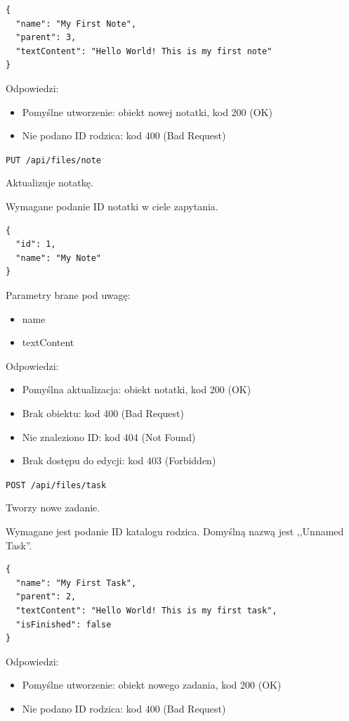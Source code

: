 \documentclass[a4paper,twoside,12pt]{book}
\begin{document}
\begin{verbatim}
{
  "name": "My First Note",
  "parent": 3,
  "textContent": "Hello World! This is my first note"
}
\end{verbatim}

Odpowiedzi: 
\begin{itemize}
	\item Pomyślne utworzenie: obiekt nowej notatki, kod 200 (OK) 
	\item Nie podano ID rodzica: kod 400 (Bad Request)
\end{itemize}

\label{update-note}

\texttt{PUT\ /api/files/note}

Aktualizuje notatkę.

Wymagane podanie ID notatki w ciele zapytania.

\begin{verbatim}
{
  "id": 1,
  "name": "My Note"
}
\end{verbatim}

Parametry brane pod uwagę: 
\begin{itemize}
	\item  name \item  textContent
\end{itemize}

Odpowiedzi: 
\begin{itemize}
	\item Pomyślna aktualizacja: obiekt notatki, kod 200 (OK) 
	\item Brak obiektu: kod 400 (Bad Request) 
	\item Nie znaleziono ID: kod 404 (Not Found)
	\item Brak dostępu do edycji: kod 403 (Forbidden)
\end{itemize}

\label{create-task}

\texttt{POST\ /api/files/task}

Tworzy nowe zadanie.

Wymagane jest podanie ID katalogu rodzica. Domyślną nazwą jest ,,Unnamed Task''.

\begin{verbatim}
{
  "name": "My First Task",
  "parent": 2,
  "textContent": "Hello World! This is my first task",
  "isFinished": false
}
\end{verbatim}

Odpowiedzi: 
\begin{itemize}
	\item Pomyślne utworzenie: obiekt nowego zadania, kod 200 (OK) 
	\item Nie podano ID rodzica: kod 400 (Bad Request)
\end{itemize}
\end{document}
